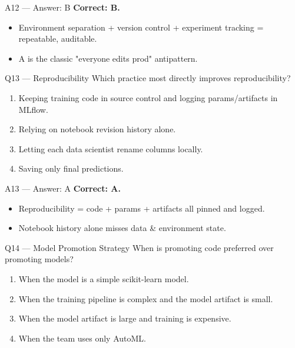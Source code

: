\documentclass[aspectratio=169,10pt]{beamer}
\begin{document}
	\begin{frame}{A12 — Answer: B}
		\textbf{Correct: B.}
		\begin{itemize}
			\item Environment separation + version control + experiment tracking = repeatable, auditable.
			\item A is the classic "everyone edits prod" antipattern.
		\end{itemize}
	\end{frame}
	
	\begin{frame}{Q13 — Reproducibility}
		Which practice most directly improves reproducibility?
		\begin{enumerate}[label=\Alph*.]
			\item Keeping training code in source control and logging params/artifacts in MLflow.
			\item Relying on notebook revision history alone.
			\item Letting each data scientist rename columns locally.
			\item Saving only final predictions.
		\end{enumerate}
	\end{frame}
	
	\begin{frame}{A13 — Answer: A}
		\textbf{Correct: A.}
		\begin{itemize}
			\item Reproducibility = code + params + artifacts all pinned and logged.
			\item Notebook history alone misses data \& environment state.
		\end{itemize}
	\end{frame}
	
	\begin{frame}{Q14 — Model Promotion Strategy}
		When is promoting code preferred over promoting models?
		\begin{enumerate}[label=\Alph*.]
			\item When the model is a simple scikit-learn model.
			\item When the training pipeline is complex and the model artifact is small.
			\item When the model artifact is large and training is expensive.
			\item When the team uses only AutoML.
		\end{enumerate}
	\end{frame}
	
\end{document}
